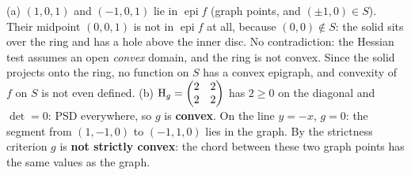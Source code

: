 \begin{solutions}
  \item (a) $(1,0,1)$ and $(-1,0,1)$ lie in $\operatorname{epi}f$ (graph
        points, and $(\pm1,0)\in S$). Their midpoint $(0,0,1)$ is not in
        $\operatorname{epi}f$ at all, because $(0,0)\notin S$: the solid
        sits over the ring and has a hole above the inner disc. No
        contradiction: the Hessian test assumes an open \emph{convex}
        domain, and the ring is not convex. Since the solid projects onto
        the ring, no function on $S$ has a convex epigraph, and convexity
        of $f$ on $S$ is not even defined.
        (b) $\operatorname{H}_g=\begin{pmatrix}2&2\\2&2\end{pmatrix}$ has $2\ge0$ on the
        diagonal and $\det=0$: PSD everywhere, so $g$ is
        \textbf{convex}. On the line $y=-x$, $g=0$: the segment from
        $(1,-1,0)$ to $(-1,1,0)$ lies in the graph. By the strictness
        criterion $g$ is \textbf{not strictly convex}: the chord between
        these two graph points has the same values as the graph.
\end{solutions}
